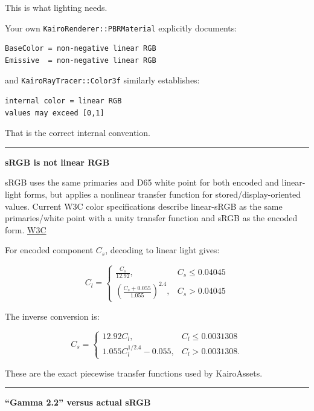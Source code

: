 This is what lighting needs.

Your own \texttt{KairoRenderer::PBRMaterial} explicitly documents:

\begin{verbatim}
BaseColor = non-negative linear RGB
Emissive  = non-negative linear RGB
\end{verbatim}

and \texttt{KairoRayTracer::Color3f} similarly establishes:

\begin{verbatim}
internal color = linear RGB
values may exceed [0,1]
\end{verbatim}

That is the correct internal convention.

\begin{center}\rule{0.5\linewidth}{0.5pt}\end{center}

\textbf{sRGB is not linear RGB}

sRGB uses the same primaries and D65 white point for both encoded and linear-light forms, but applies a nonlinear transfer function for stored/display-oriented values. Current W3C color specifications describe linear-sRGB as the same primaries/white point with a unity transfer function and sRGB as the encoded form. \href{https://www.w3.org/TR/css-color/?utm_source=chatgpt.com}{W3C}

For encoded component \(C_s\), decoding to linear light gives:

\[
\boxed{
C_l=
\begin{cases}
\frac{C_s}{12.92},
&
C_s\le0.04045
\\[6pt]
\left(
\frac{C_s+0.055}{1.055}
\right)^{2.4},
&
C_s>0.04045
\end{cases}
}
\]

The inverse conversion is:

\[
\boxed{
C_s=
\begin{cases}
12.92C_l,
&
C_l\le0.0031308
\\[6pt]
1.055C_l^{1/2.4}-0.055,
&
C_l>0.0031308.
\end{cases}
}
\]

These are the exact piecewise transfer functions used by KairoAssets.

\begin{center}\rule{0.5\linewidth}{0.5pt}\end{center}

\textbf{``Gamma 2.2'' versus actual sRGB}

